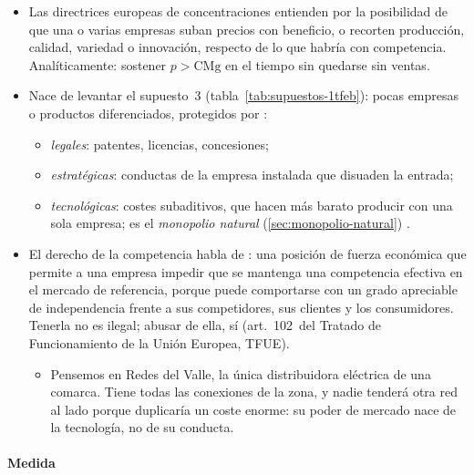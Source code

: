 \documentclass[11pt]{article}
\begin{document}
\begin{itemize}
\item Las directrices europeas de concentraciones entienden por  la posibilidad de que una o varias empresas suban precios con beneficio, o recorten producción, calidad, variedad o innovación, respecto de lo que habría con competencia\nocite{CE2004Horizontales}. Analíticamente: sostener $p>\mathrm{CMg}$ en el tiempo sin quedarse sin ventas.
\item Nace de levantar el supuesto~3 (tabla~\ref{tab:supuestos-1tfeb}): pocas empresas o productos diferenciados, protegidos por  :
  \begin{itemize}
  \item \emph{legales}: patentes, licencias, concesiones;
  \item \emph{estratégicas}: conductas de la empresa instalada que disuaden la entrada;
  \item \emph{tecnológicas}: costes subaditivos, que hacen más barato producir con una sola empresa; es el \emph{monopolio natural} (\ref{sec:monopolio-natural}) .
  \end{itemize}
\item El derecho de la competencia habla de : una posición de fuerza económica que permite a una empresa impedir que se mantenga una competencia efectiva en el mercado de referencia, porque puede comportarse con un grado apreciable de independencia frente a sus competidores, sus clientes y los consumidores\nocite{TJUE1979HoffmannLaRoche}. Tenerla no es ilegal; abusar de ella, sí (art.~102~del Tratado de Funcionamiento de la Unión Europea, TFUE).
  \begin{itemize}
  \item Pensemos en Redes del Valle, la única distribuidora eléctrica de una comarca. Tiene todas las conexiones de la zona, y nadie tenderá otra red al lado porque duplicaría un coste enorme: su poder de mercado nace de la tecnología, no de su conducta.
  \end{itemize}
\end{itemize}

\paragraph{Medida}
\end{document}
